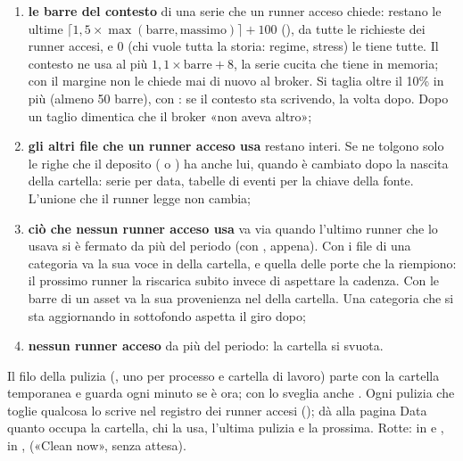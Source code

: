 \begin{enumerate}[leftmargin = 1.4em, itemsep = 3pt]
  \item \textbf{le barre del contesto} di una serie che un runner acceso
    chiede: restano le ultime $\lceil 1{,}5 \times \max(\text{barre},
    \text{massimo})\rceil + 100$ (), da tutte le
    richieste dei runner accesi, e \num{0} (chi vuole tutta la storia: regime,
    stress) le tiene tutte. Il contesto ne usa al più
    $1{,}1 \times \text{barre} + 8$, la serie cucita che tiene in memoria;
    con il margine non le chiede mai di nuovo al broker. Si taglia oltre il
    10\% in più (almeno \num{50} barre), con : se il
    contesto sta scrivendo, la volta dopo. Dopo un taglio
     dimentica che il broker «non aveva altro»;
  \item \textbf{gli altri file che un runner acceso usa} restano interi. Se ne
    tolgono solo le righe che il deposito ( o )
    ha anche lui, quando è cambiato dopo la nascita della cartella: serie
    per data, tabelle di eventi per la chiave della fonte. L'unione che il
    runner legge non cambia;
  \item \textbf{ciò che nessun runner acceso usa} va via quando l'ultimo runner
    che lo usava si è fermato da più del periodo (con , appena).
    Con i file di una categoria va la sua voce in
    \mbox{} della cartella, e quella delle porte che la riempiono: il prossimo runner
    la riscarica subito invece di aspettare la cadenza. Con le barre di un
    asset va la sua provenienza nel  della cartella. Una
    categoria che si sta aggiornando in sottofondo aspetta il giro dopo;
  \item \textbf{nessun runner acceso} da più del periodo: la cartella si
    svuota.
\end{enumerate}

\noindent
Il filo della pulizia (, uno per processo e
cartella di lavoro) parte con la cartella temporanea e guarda ogni minuto se
è ora; con  lo sveglia anche . Ogni pulizia
che toglie qualcosa lo scrive nel registro dei runner accesi
();  dà alla pagina Data quanto occupa la
cartella, chi la usa, l'ultima pulizia e la prossima. Rotte: 
in  e ,  in ,
 («Clean now», senza attesa).

